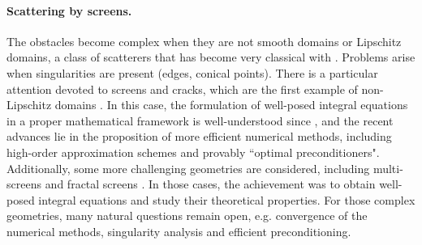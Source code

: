 \documentclass[]{article}
\begin{document}
\paragraph{Scattering by screens.} The obstacles become complex when they are not smooth domains or Lipschitz domains, a class of scatterers that has become very classical with \cite{mclean2000strongly}. Problems arise when singularities are present (edges, conical points). There is a particular attention devoted to screens and cracks, which are the first example of non-Lipschitz domains \cite{bruno2013high,gimperlein2019optimal,hiptmair2018closed,hiptmair2019preconditioning,hiptmair2020optimal,hiptmair2020compact,ramaciotti2017some}. In this case, the formulation of well-posed integral equations in a proper mathematical framework is well-understood since \cite{stephan1984augmented,wendland1990hypersingular}, and the recent advances lie in the proposition of more efficient numerical methods, including high-order approximation schemes and provably ``optimal preconditioners". Additionally, some more challenging geometries are considered, including multi-screens \cite{claeys2013integral,claeys2020quotient} and fractal screens \cite{chandlerWilde2017sobolev}. In those cases, the achievement was to obtain well-posed integral equations and study their theoretical properties. For those complex geometries, many natural questions remain open, e.g. convergence of the numerical methods, singularity analysis and efficient preconditioning. 
\end{document}
